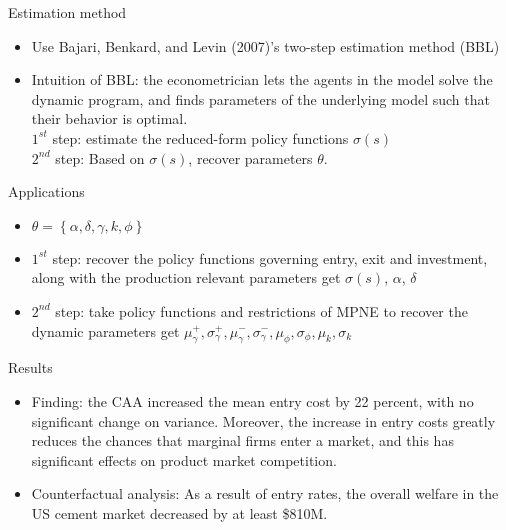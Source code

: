 \documentclass[aspectratio=169]{beamer}  %
\begin{document}
\begin{frame}{Estimation method}    
    \begin{itemize}
    \item Use Bajari, Benkard, and Levin (2007)'s two-step estimation method (BBL)
    \item Intuition of BBL:  the econometrician lets the agents in the model solve the dynamic program, and ﬁnds parameters of the underlying model such that their behavior is optimal. \\
    $1^{st}$ step: estimate the reduced-form policy functions $\sigma(s)$ \\
    $2^{nd}$ step: Based on $\sigma(s)$, recover parameters $\theta$.
    
    \end{itemize}
\end{frame}

\begin{frame}{Applications}    
    \begin{itemize}
    \item $\theta= \left\{ \alpha, \delta, \gamma, k, \phi \right\}$
    \item $1^{st}$ step: recover the policy functions governing entry, exit and investment, along with the production relevant parameters \Rightarrow get  
     $ \sigma(s)$, $\alpha$, $\delta$
    \item $2^{nd}$ step: take policy functions and restrictions of MPNE to recover the dynamic parameters \Rightarrow get $ \mu_{\gamma}^+, \sigma_{\gamma}^+, \mu_{\gamma}^-, \sigma_{\gamma}^-, \mu_{\phi}, \sigma_{\phi}, \mu_{k}, \sigma_{k}$
    \end{itemize}
\end{frame}

\begin{frame}{Results}    
    \begin{itemize}
    \item Finding: the CAA increased the mean entry cost by 22 percent, with no significant change on variance. Moreover,  the increase in entry costs greatly reduces the chances that marginal firms enter a market, and this has significant effects on product market competition.
    \item Counterfactual analysis: As a result of entry rates, the overall welfare in the US cement market decreased by at least \$810M.
    \end{itemize}
\end{frame}

\end{document}

